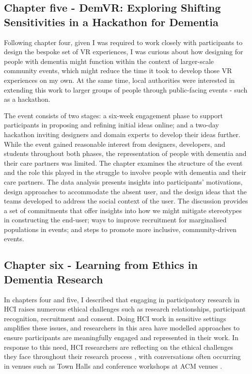 \subsection{Chapter five - DemVR: Exploring Shifting Sensitivities in a Hackathon for Dementia}
\label{Intro:ChapterFive}
Following chapter four, given I was required to work closely with participants to design the bespoke set of VR experiences, I was curious about how designing for people with dementia might function within the context of larger-scale community events, which might reduce the time it took to develop those VR experiences on my own. At the same time, local authorities were interested in extending this work to larger groups of people through public-facing events - such as a hackathon. 

The event consists of two stages: a six-week engagement phase to support participants in proposing and refining initial ideas online; and a two-day hackathon inviting designers and domain experts to develop their ideas further. While the event gained reasonable interest from designers, developers, and students throughout both phases, the representation of people with dementia and their care partners was limited. The chapter examines the structure of the event and the role this played in the struggle to involve people with dementia and their care partners. The data analysis presents insights into participants’ motivations, design approaches to accommodate the absent user, and the design ideas that the teams developed to address the social context of the user. The discussion provides a set of commitments that offer insights into how we might mitigate stereotypes in constructing the end-user; ways to improve recruitment for marginalised populations in events; and steps to promote more inclusive, community-driven events. 

\subsection{Chapter six - Learning from Ethics in Dementia Research}
\label{Intro:ChapterSix}
In chapters four and five, I described that engaging in participatory research in HCI raises numerous ethical challenges such as research relationships, participant recognition, recruitment and consent. Doing HCI work in sensitive settings amplifies these issues, and researchers in this area have modelled approaches to ensure participants are meaningfully engaged and represented in their work. In response to this need, HCI researchers are reflecting on the ethical challenges they face throughout their research process \citep{vines_designing_2013}, with conversations often occurring in venues such as Town Halls \citep{munteanu_sigchi_2019,bruckman_cscw_2017} and conference workshops at ACM venues \citep{davis_ethical_2015,waycott_challenge_2015}.

